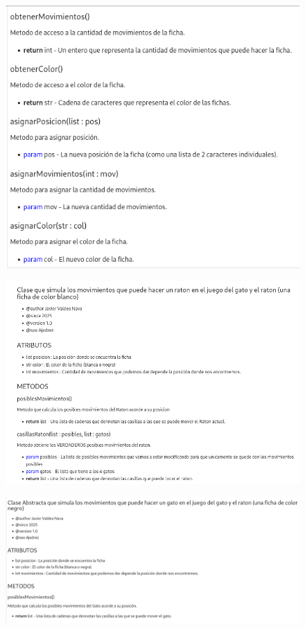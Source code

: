 \documentclass[12pt, Tahoma]{article}
\begin{document}
	\begin{figure}[H]
		\centering
		\includegraphics[scale=0.6]{ClaseAjedrez2.png}
	\end{figure}
	\begin{figure}[H]
		\centering
		\includegraphics[scale=0.6]{ClaseRaton.png}
	\end{figure}
	\begin{figure}[H]
		\centering
		\includegraphics[scale=0.4]{ClaseGato1.png}
	\end{figure}
\end{document}
